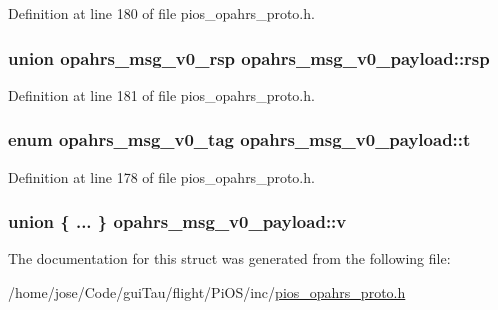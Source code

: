 Definition at line 180 of file pios\-\_\-opahrs\-\_\-proto.\-h.

\hypertarget{structopahrs__msg__v0__payload_aadee06f1ce237ba7dd5070d539b67c5c}{
\subsubsection[{rsp}]{\setlength{\rightskip}{0pt plus 5cm}union {\bf opahrs\-\_\-msg\-\_\-v0\-\_\-rsp} opahrs\-\_\-msg\-\_\-v0\-\_\-payload\-::rsp}}\label{structopahrs__msg__v0__payload_aadee06f1ce237ba7dd5070d539b67c5c}


Definition at line 181 of file pios\-\_\-opahrs\-\_\-proto.\-h.

\hypertarget{structopahrs__msg__v0__payload_ab11688c3cb10ea64e20ecb0467cee991}{
\subsubsection[{t}]{\setlength{\rightskip}{0pt plus 5cm}enum {\bf opahrs\-\_\-msg\-\_\-v0\-\_\-tag} opahrs\-\_\-msg\-\_\-v0\-\_\-payload\-::t}}\label{structopahrs__msg__v0__payload_ab11688c3cb10ea64e20ecb0467cee991}


Definition at line 178 of file pios\-\_\-opahrs\-\_\-proto.\-h.

\hypertarget{structopahrs__msg__v0__payload_a3230331387b25d07af10c4fab4e8adae}{
\subsubsection[{v}]{\setlength{\rightskip}{0pt plus 5cm}union \{ ... \}   opahrs\-\_\-msg\-\_\-v0\-\_\-payload\-::v}}\label{structopahrs__msg__v0__payload_a3230331387b25d07af10c4fab4e8adae}


The documentation for this struct was generated from the following file\-:\begin{DoxyCompactItemize}
\item 
/home/jose/\-Code/gui\-Tau/flight/\-Pi\-O\-S/inc/\hyperlink{pios__opahrs__proto_8h}{pios\-\_\-opahrs\-\_\-proto.\-h}\end{DoxyCompactItemize}
